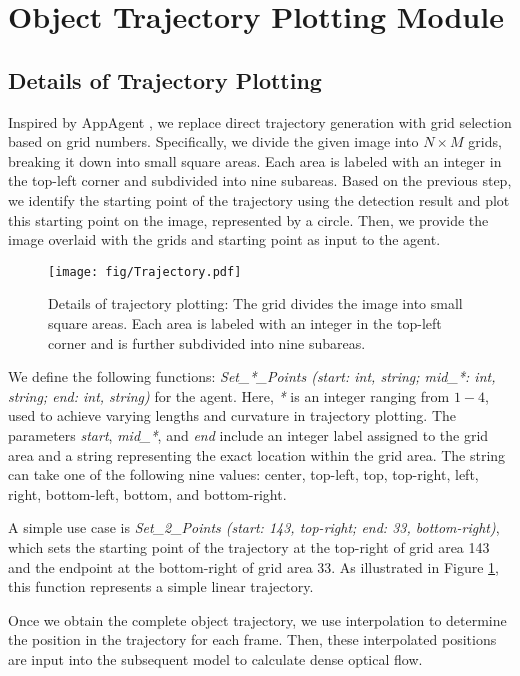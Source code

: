 \maketitlesupplementary

\section{Object Trajectory Plotting Module}
\subsection{Details of Trajectory Plotting}
Inspired by AppAgent \cite{zhang2023appagent}, we replace direct trajectory generation with grid selection based on grid numbers. Specifically, we divide the given image into $N \times M$ grids, breaking it down into small square areas. Each area is labeled with an integer in the top-left corner and subdivided into nine subareas. Based on the previous step, we identify the starting point of the trajectory using the detection result and plot this starting point on the image, represented by a circle. Then, we provide the image overlaid with the grids and starting point as input to the agent.

\begin{figure}[b]
\centering
\texttt{[image: fig/Trajectory.pdf]}
\caption{Details of trajectory plotting: The grid divides the image into small square areas. Each area is labeled with an integer in the top-left corner and is further subdivided into nine subareas.}
\label{fig:trajectory}
\end{figure}

We define the following functions: \textit{Set\_*\_Points (start: int, string; mid\_*: int, string; end: int, string)} for the agent. Here, \textit{*} is an integer ranging from $1-4$, used to achieve varying lengths and curvature in trajectory plotting. The parameters \textit{start}, \textit{mid\_*}, and \textit{end} include an integer label assigned to the grid area and a string representing the exact location within the grid area. The string can take one of the following nine values: center, top-left, top, top-right, left, right, bottom-left, bottom, and bottom-right.

A simple use case is \textit{Set\_2\_Points (start: 143, top-right; end: 33, bottom-right)}, which sets the starting point of the trajectory at the top-right of grid area 143 and the endpoint at the bottom-right of grid area 33. As illustrated in Figure \ref{fig:trajectory}, this function represents a simple linear trajectory.

Once we obtain the complete object trajectory, we use interpolation to determine the position in the trajectory for each frame. Then, these interpolated positions are input into the subsequent model to calculate dense optical flow.

